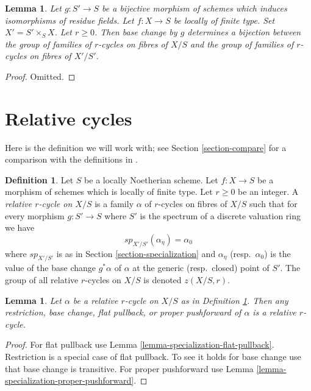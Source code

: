 \documentclass{stacks-project}
\theoremstyle{plain}
\newtheorem{lemma}[subsection]{Lemma}
\theoremstyle{definition}
\newtheorem{definition}[subsection]{Definition}
\theoremstyle{remark}
\numberwithin{equation}{subsection}
\begin{document}
\begin{lemma}
\label{lemma-pullback-universally-bijective}
Let $g : S' \to S$ be a bijective morphism of schemes
which induces isomorphisms of residue fields.
Let $f : X \to S$ be locally of finite type. Set $X' = S' \times_S X$.
Let $r \geq 0$. Then base change by $g$ determines a bijection
between the group of families of $r$-cycles on fibres of $X/S$ and
the group of families of $r$-cycles on fibres of $X'/S'$.
\end{lemma}

\begin{proof}
Omitted.
\end{proof}








\section{Relative cycles}
\label{section-families-specialization}

\noindent
Here is the definition we will work with; see Section \ref{section-compare}
for a comparison with the definitions in \cite{SV}.

\begin{definition}
\label{definition-relative-cycles}
Let $S$ be a locally Noetherian scheme. Let $f : X \to S$ be a morphism of
schemes which is locally of finite type. Let $r \geq 0$ be an integer.
A {\it relative $r$-cycle on $X/S$} is a family $\alpha$ of $r$-cycles
on fibres of $X/S$ such that for every morphism $g : S' \to S$
where $S'$ is the spectrum of a discrete valuation ring we have
$$
sp_{X'/S'}(\alpha_\eta) = \alpha_0
$$
where $sp_{X'/S'}$ is as in Section \ref{section-specialization}
and $\alpha_\eta$ (resp.\ $\alpha_0$) is the value of the base change
$g^*\alpha$ of $\alpha$ at the generic (resp.\ closed) point of $S'$.
The group of all relative $r$-cycles on $X/S$ is denoted $z(X/S, r)$.
\end{definition}

\begin{lemma}
\label{lemma-relative-cycle-functoriality}
Let $\alpha$ be a relative $r$-cycle on $X/S$ as in
Definition \ref{definition-relative-cycles}.
Then any restriction, base change, flat pullback, or proper pushforward
of $\alpha$ is a relative $r$-cycle.
\end{lemma}

\begin{proof}
For flat pullback use Lemma \ref{lemma-specialization-flat-pullback}.
Restriction is a special case of flat pullback. To see it holds for
base change use that base change is transitive.
For proper pushforward use Lemma \ref{lemma-specialization-proper-pushforward}.
\end{proof}
\end{document}
